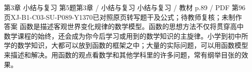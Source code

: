 \par\noindent\begin{minipage}{\linewidth}
\begin{bankitem}{第3章 小结与复习 第5题}{第3章 / 小结与复习 小结与复习 / 教材 p.89 / PDF 第96页}{XJ-B1-C03-SU-P089-Y1370}{已对照原页转写题干及公式；待教师复核；未制作答案}
函数是描述客观世界变化规律的数学模型。函数的思想方法不仅将贯穿高中数学课程的始终，还会成为你今后学习或用到的数学知识的主旋律。小学到初中所学的数学知识，大都可以放到函数的框架之中；大量的实际问题，可以用函数模型来描述和解决。用函数的观点看数学和其他学科里的许多问题，常有纲举目张的效果。
\end{bankitem}
\end{minipage}\par\medskip
